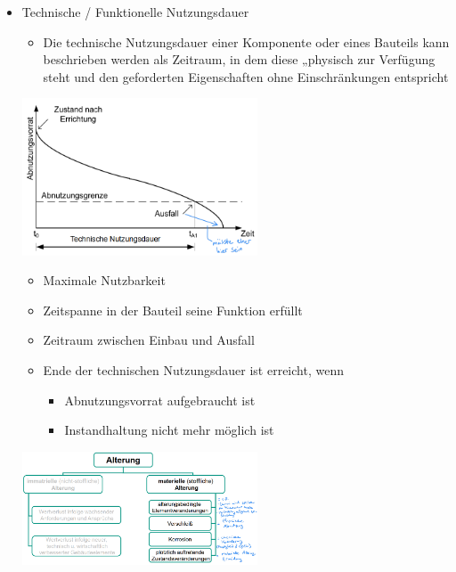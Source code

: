 \documentclass[fleqn,twoside,dvipsnames]{article}
\begin{document}
\begin{itemize}
\begin{itemize}
\begin{itemize}
                        \end{itemize}
                \end{itemize}
            \item Technische / Funktionelle Nutzungsdauer
                \begin{itemize}
                    \item Die technische Nutzungsdauer einer Komponente oder eines Bauteils kann beschrieben werden als Zeitraum, in dem diese „physisch zur Verfügung steht und den geforderten Eigenschaften ohne Einschränkungen entspricht
                \end{itemize}
                \includegraphics[width=0.55\textwidth]{Grafiken/Lebensdauer und Abnutzung von Bauteilen/Technische - Funktionelle Nutzungsdauer.png}
                \begin{itemize}
                    \item Maximale Nutzbarkeit
                    \item Zeitspanne in der Bauteil seine Funktion erfüllt
                    \item Zeitraum zwischen Einbau und Ausfall
                    \item Ende der technischen Nutzungsdauer ist erreicht, wenn
                        \begin{itemize}
                            \item Abnutzungsvorrat aufgebraucht ist
                            \item Instandhaltung nicht mehr möglich ist
                        \end{itemize}
                \end{itemize}
                \includegraphics[width=0.55\textwidth]{Grafiken/Lebensdauer und Abnutzung von Bauteilen/Alterung.png}

\end{itemize}
\end{document}
